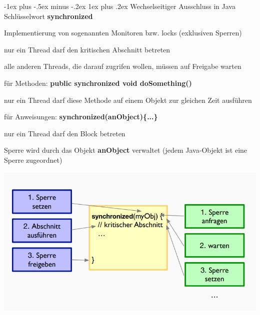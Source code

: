 \documentclass[10pt]{article}
\makeatletter
\renewcommand{\subsubsection}{\@startsection{subsubsection}{3}{0mm}%
                                {-1ex plus -.5ex minus -.2ex}%
                                {1ex plus .2ex}%
                                {\normalfont\small\bfseries}}
\makeatother
\begin{document}
\subsubsection{Wechselseitiger Ausschluss in Java}
Schlüsselwort \textbf{synchronized}
\begin{itemize*}
  \item Implementierung von sogenannten Monitoren bzw. locks (exklusiven Sperren)
  \begin{itemize*}
    \item nur ein Thread darf den kritischen Abschnitt betreten
    \item alle anderen Threads, die darauf zugrifen wollen, müssen auf Freigabe warten
  \end{itemize*}
  \item für Methoden: \textbf{public synchronized void doSomething()}
  \begin{itemize*}
    \item nur ein Thread darf diese Methode auf einem Objekt zur gleichen Zeit ausführen
  \end{itemize*}
  \item für Anweisungen: \textbf{synchronized(anObject)\{...\}}
  \begin{itemize*}
    \item nur ein Thread darf den Block betreten
    \item Sperre wird durch das Objekt \textbf{anObject} verwaltet (jedem Java-Objekt ist eine Sperre zugeordnet)
  \end{itemize*}
\end{itemize*}
\begin{center}
  \includegraphics[width=0.4\linewidth]{Assets/Programmierparadigmen-java-synchronized}
\end{center}
\end{document}
